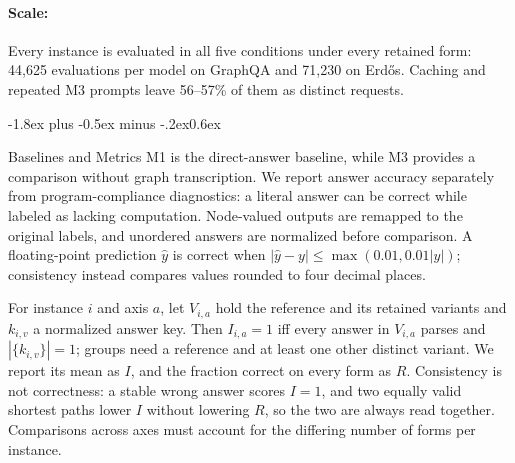 \documentclass[11pt]{article}
\makeatletter
\renewcommand\subsection{\@startsection{subsection}{2}{\z@}
  {-1.8ex plus -0.5ex minus -.2ex}{0.6ex}
  {\normalsize\bfseries\raggedright}}
\makeatother
\begin{document}
\paragraph{Scale:}
Every instance is evaluated in all five conditions under every retained form:
44{,}625 evaluations per model on GraphQA and 71{,}230 on Erd\H{o}s. Caching and
repeated M3 prompts leave 56--57\% of them as distinct requests.

\subsection{Baselines and Metrics}
M1 is the direct-answer baseline, while M3 provides a comparison without graph
transcription. We report answer accuracy separately from program-compliance
diagnostics: a literal answer can be correct while labeled as lacking
computation. Node-valued outputs are remapped to the original labels, and
unordered answers are normalized before comparison. A floating-point prediction
$\hat{y}$ is correct when $|\hat{y}-y|\leq\max(0.01,0.01|y|)$; consistency
instead compares values rounded to four decimal places.

For instance $i$ and axis $a$, let $V_{i,a}$ hold the reference and its retained
variants and $k_{i,v}$ a normalized answer key. Then $I_{i,a}=1$ iff every answer in
$V_{i,a}$ parses and $|\{k_{i,v}\}|=1$; groups need a reference and at least one
other distinct variant. We report its mean as $I$, and the fraction correct on every
form as $R$. Consistency is not correctness: a stable wrong answer scores $I=1$, and
two equally valid shortest paths lower $I$ without lowering $R$, so the two are
always read together. Comparisons across axes must account for the differing number
of forms per instance.
\end{document}
